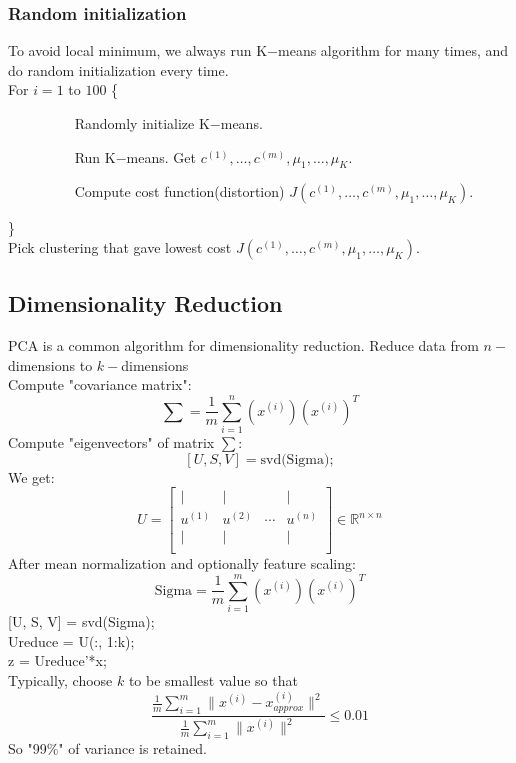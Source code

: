 \documentclass{article}
\begin{document}
\subsubsection{Random initialization}
To avoid local minimum, we always run K$-$means algorithm for many times, and do random initialization every time.\\
For $i = 1$ to $100$ \{\par
$\hspace{2cm}$Randomly initialize K$-$means.\par
$\hspace{2cm}$Run K$-$means. Get $c^{(1)}, \ldots, c^{(m)}, \mu_1, \ldots, \mu_K.$\par
$\hspace{2cm}$Compute cost function(distortion) $J(c^{(1)}, \ldots, c^{(m)}, \mu_1, \ldots, \mu_K)$.\par
\}\\
Pick clustering that gave lowest cost $J(c^{(1)}, \ldots, c^{(m)}, \mu_1, \ldots, \mu_K)$.

\subsection{Dimensionality Reduction}
PCA is a common algorithm for dimensionality reduction.
Reduce data from $n-$dimensions to $k-$dimensions\\
Compute "covariance matrix":\[\sum = \frac{1}{m}\sum\limits_{i=1}^n(x^{(i)})(x^{(i)})^T\]
Compute "eigenvectors" of matrix $\sum$:\[[U, S, V] = \text{svd(Sigma)};\]
We get:\[U = \left[
               \begin{array}{cccc}
                 | & | &   & | \\
                 u^{(1)} & u^{(2)} & \cdots & u^{(n)} \\
                 | & | &   & | \\
               \end{array}
             \right] \in \mathbb{R}^{n \times n}
\]
After mean normalization and optionally feature scaling:\[\text{Sigma} = \frac{1}{m}\sum\limits_{i=1}^m(x^{(i)})(x^{(i)})^T\]
[U, S, V] = svd(Sigma);\\
Ureduce = U(:, 1:k);\\
z = Ureduce'*x;\\
Typically, choose $k$ to be smallest value so that \[\frac{\frac{1}{m}\sum_{i=1}^m\|x^{(i)} - x_{approx}^{(i)}\|^2}{\frac{1}{m}\sum_{i=1}^m\|x^{(i)}\|^2} \leq 0.01\]
So "99\%" of variance is retained.
\end{document}
